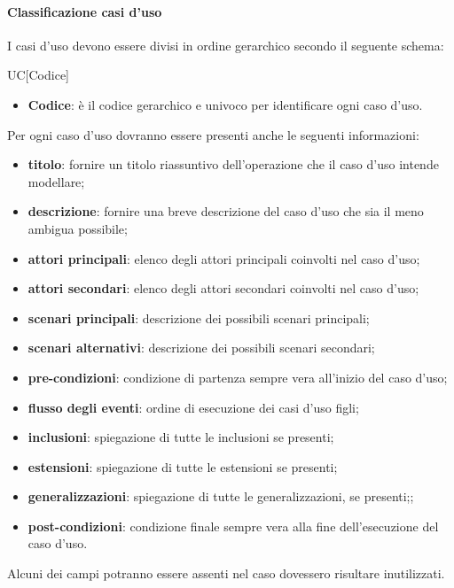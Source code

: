 			\paragraph{Classificazione casi d'uso}
I casi d'uso devono essere divisi in ordine gerarchico secondo il seguente schema: \\
				\begin{center}
					UC[Codice]
				\end{center}
				\begin{itemize}
					\item \textbf{Codice}: è il codice gerarchico e univoco per identificare ogni caso d'uso.
				\end{itemize}
			\noindent Per ogni caso d'uso dovranno essere presenti anche le seguenti informazioni:
				\begin{itemize}
					\item \textbf{titolo}: fornire un titolo riassuntivo dell'operazione che il caso d'uso intende modellare;
					\item \textbf{descrizione}: fornire una breve descrizione del caso d'uso che sia il meno ambigua possibile;
					\item \textbf{attori principali}: elenco degli attori principali coinvolti nel caso d'uso;
					\item \textbf{attori secondari}: elenco degli attori secondari coinvolti nel caso d'uso;
					\item \textbf{scenari principali}: descrizione dei possibili scenari principali;
					\item \textbf{scenari alternativi}: descrizione dei possibili scenari secondari;
					\item \textbf{pre-condizioni}: condizione di partenza sempre vera all'inizio del caso d’uso;
					\item \textbf{flusso degli eventi}: ordine di esecuzione dei casi d'uso figli;
					\item \textbf{inclusioni}: spiegazione di tutte le inclusioni se presenti;
					\item \textbf{estensioni}: spiegazione di tutte le estensioni se presenti;
					\item \textbf{generalizzazioni}: spiegazione di tutte le generalizzazioni, se presenti;;
					\item \textbf{post-condizioni}: condizione finale sempre vera alla fine dell'esecuzione del caso d'uso.
				\end{itemize}
			\noindent
			Alcuni dei campi potranno essere assenti nel caso dovessero risultare inutilizzati.


